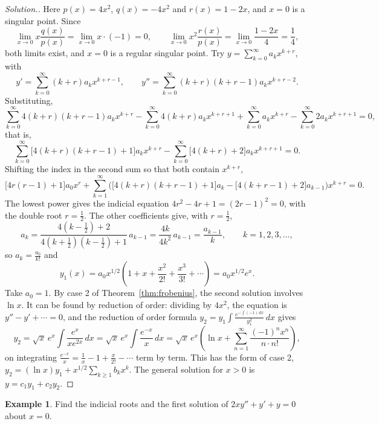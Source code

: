 \documentclass[11pt,a4paper]{article}
\theoremstyle{definition}
\newtheorem{exa}[thm]{Example}
\newenvironment{solution}
  {\renewcommand{\qedsymbol}{}\begin{proof}[\textit{Solution}.]}
  {\end{proof}}
\begin{document}
\begin{solution}
Here $p(x) = 4x^2$, $q(x) = -4x^2$ and $r(x) = 1-2x$, and $x = 0$ is a singular
point. Since
\[\lim_{x \to 0} x \frac{q(x)}{p(x)} = \lim_{x \to 0} x\cdot(-1) = 0 ,\qquad
\lim_{x \to 0} x^2 \frac{r(x)}{p(x)} = \lim_{x \to 0} \frac{1-2x}{4} = \frac{1}{4}
,\]
both limits exist, and $x = 0$ is a regular singular point. Try
$y = \sum^{\infty}_{k=0} a_kx^{k+r}$, with
\[y' = \sum^{\infty}_{k = 0} (k+r)a_k x^{k+r -1},\qquad y'' = \sum^{\infty}_{k =
0} (k+r) (k+r -1)a_k x^{k+r -2} .\]
Substituting,
\[\sum^{\infty}_{k = 0}4(k+ r)(k+r - 1) a_k x^{k+r} - \sum^{\infty}_{k = 0} 4
(k+r)a_k x^{k + r + 1} + \sum^{\infty}_{k = 0} a_k x^{k+ r} - \sum^{\infty}_{k =
0}2a_k x^{k + r + 1} = 0 ,\]
that is,
\[\sum^{\infty}_{k = 0}\big[ 4(k+r)(k + r -1) + 1\big] a_k x^{k + r} -
\sum^{\infty}_{k = 0}\big[4(k+r) + 2\big] a_k x^{k+r + 1} = 0 .\]
Shifting the index in the second sum so that both contain $x^{k+r}$,
\[\big[4r(r-1)+1\big]a_0x^r + \sum^{\infty}_{k = 1}\Big(\big[4(k+r) (k+r-1) +
1\big] a_k - \big[4(k+r - 1 ) + 2\big] a_{k -1}\Big)x^{k +r} = 0 .\]
The lowest power gives the indicial equation $4r^2 - 4r + 1 = (2r - 1)^2 = 0$,
with the double root $r = \frac{1}{2}$. The other coefficients give, with
$r = \frac12$,
\[a_k = \frac{4\left(k - \frac12\right) + 2}{4\left(k+ \frac{1}{2}\right)\left( k
- \frac{1}{2}\right) + 1}\, a_{k-1} = \frac{4k}{4k^2}\,a_{k-1} =
\frac{a_{k-1}}{k} ,\qquad k = 1,2,3,\dots ,\]
so $a_k = \frac{a_0}{k!}$ and
\[y_1(x) = a_0x^{1/2}\left(1 + x + \frac{x^2}{2!} + \frac{x^3}{3!} +
\cdots\right) = a_0 x^{1/2}e^x .\]
Take $a_0 = 1$. By case 2 of Theorem~\ref{thm:frobenius}, the second solution
involves $\ln x$. It can be found by reduction of order: dividing by $4x^2$, the
equation is $y'' - y' + \cdots = 0$, and the reduction of order formula
$y_2 = y_1\int\frac{e^{-\int(-1)\,dx}}{y_1^2}\,dx$ gives
\[y_2 = \sqrt x\,e^x\int\frac{e^x}{xe^{2x}}\,dx = \sqrt x\,e^x\int\frac{e^{-x}}{x}
\,dx = \sqrt x\,e^x\left(\ln x + \sum_{n=1}^\infty\frac{(-1)^nx^n}{n\cdot
n!}\right),\]
on integrating $\frac{e^{-x}}{x} = \frac1x - 1 + \frac{x}{2!} - \cdots$ term by
term. This has the form of case 2, $y_2 = (\ln x)y_1 + x^{1/2}\sum_{k\geq 1}b_kx^k$.
The general solution for $x>0$ is $y = c_1y_1 + c_2y_2$.
\end{solution}

\begin{exa}
\label{ex:frobeniusdistinct}
Find the indicial roots and the first solution of $2xy'' + y' + y = 0$ about
$x = 0$.
\end{exa}
\end{document}
